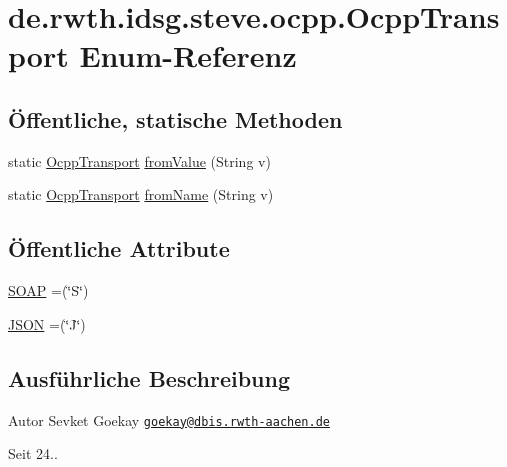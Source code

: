 \hypertarget{enumde_1_1rwth_1_1idsg_1_1steve_1_1ocpp_1_1_ocpp_transport}{\section{de.\+rwth.\+idsg.\+steve.\+ocpp.\+Ocpp\+Transport Enum-\/\+Referenz}
\label{enumde_1_1rwth_1_1idsg_1_1steve_1_1ocpp_1_1_ocpp_transport}
}
\subsection*{Öffentliche, statische Methoden}
\begin{DoxyCompactItemize}
\item 
static \hyperlink{enumde_1_1rwth_1_1idsg_1_1steve_1_1ocpp_1_1_ocpp_transport}{Ocpp\+Transport} \hyperlink{enumde_1_1rwth_1_1idsg_1_1steve_1_1ocpp_1_1_ocpp_transport_a64ec586d12d40966424ce811f697b852}{from\+Value} (String v)
\item 
static \hyperlink{enumde_1_1rwth_1_1idsg_1_1steve_1_1ocpp_1_1_ocpp_transport}{Ocpp\+Transport} \hyperlink{enumde_1_1rwth_1_1idsg_1_1steve_1_1ocpp_1_1_ocpp_transport_a0c738a026b87016fca5b8254b6d1f1c9}{from\+Name} (String v)
\end{DoxyCompactItemize}
\subsection*{Öffentliche Attribute}
\begin{DoxyCompactItemize}
\item 
\hyperlink{enumde_1_1rwth_1_1idsg_1_1steve_1_1ocpp_1_1_ocpp_transport_ae1fa7bdd519c49e7c5d175538ec2eb47}{S\+O\+A\+P} =(\char`\"{}S\char`\"{})
\item 
\hyperlink{enumde_1_1rwth_1_1idsg_1_1steve_1_1ocpp_1_1_ocpp_transport_aa9ac4184d327d7868285a13790f45cdc}{J\+S\+O\+N} =(\char`\"{}J\char`\"{})
\end{DoxyCompactItemize}


\subsection{Ausführliche Beschreibung}
\begin{DoxyAuthor}{Autor}
Sevket Goekay \href{mailto:goekay@dbis.rwth-aachen.de}{\tt goekay@dbis.\+rwth-\/aachen.\+de} 
\end{DoxyAuthor}
\begin{DoxySince}{Seit}
24.. 
\end{DoxySince}


